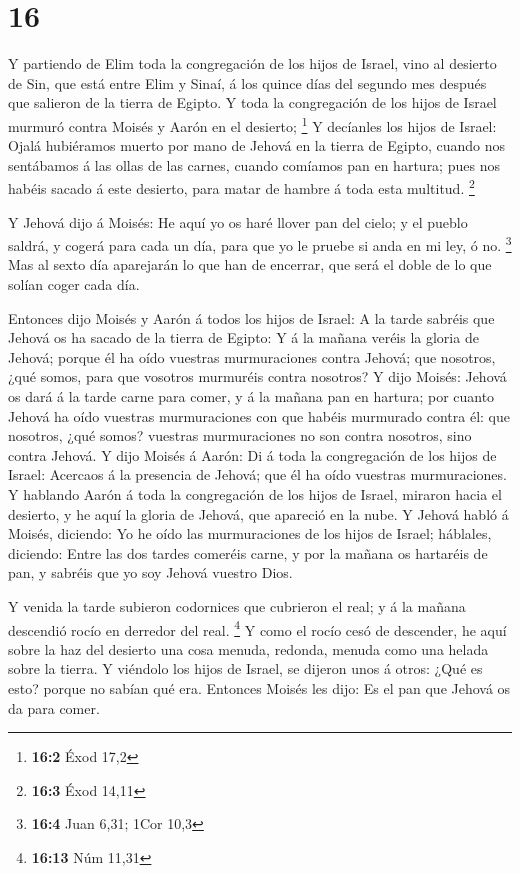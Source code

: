 \hypertarget{section-15}{%
\section{16}\label{section-15}}

 Y partiendo de Elim toda la congregación de los hijos de
Israel, vino al desierto de Sin, que está entre Elim y Sinaí, á los
quince días del segundo mes después que salieron de la tierra de Egipto.
 Y toda la congregación de los hijos de Israel murmuró
contra Moisés y Aarón en el desierto; \footnote{\textbf{16:2} Éxod 17,2}
 Y decíanles los hijos de Israel: Ojalá hubiéramos muerto
por mano de Jehová en la tierra de Egipto, cuando nos sentábamos á las
ollas de las carnes, cuando comíamos pan en hartura; pues nos habéis
sacado á este desierto, para matar de hambre á toda esta multitud.
\footnote{\textbf{16:3} Éxod 14,11}

 Y Jehová dijo á Moisés: He aquí yo os haré llover pan del
cielo; y el pueblo saldrá, y cogerá para cada un día, para que yo le
pruebe si anda en mi ley, ó no. \footnote{\textbf{16:4} Juan 6,31; 1Cor
  10,3}  Mas al sexto día aparejarán lo que han de encerrar,
que será el doble de lo que solían coger cada día.

 Entonces dijo Moisés y Aarón á todos los hijos de Israel: A
la tarde sabréis que Jehová os ha sacado de la tierra de Egipto:
 Y á la mañana veréis la gloria de Jehová; porque él ha oído
vuestras murmuraciones contra Jehová; que nosotros, ¿qué somos, para que
vosotros murmuréis contra nosotros?  Y dijo Moisés: Jehová
os dará á la tarde carne para comer, y á la mañana pan en hartura; por
cuanto Jehová ha oído vuestras murmuraciones con que habéis murmurado
contra él: que nosotros, ¿qué somos? vuestras murmuraciones no son
contra nosotros, sino contra Jehová.  Y dijo Moisés á Aarón:
Di á toda la congregación de los hijos de Israel: Acercaos á la
presencia de Jehová; que él ha oído vuestras murmuraciones.
 Y hablando Aarón á toda la congregación de los hijos de
Israel, miraron hacia el desierto, y he aquí la gloria de Jehová, que
apareció en la nube.  Y Jehová habló á Moisés, diciendo:
 Yo he oído las murmuraciones de los hijos de Israel;
háblales, diciendo: Entre las dos tardes comeréis carne, y por la mañana
os hartaréis de pan, y sabréis que yo soy Jehová vuestro Dios.

 Y venida la tarde subieron codornices que cubrieron el
real; y á la mañana descendió rocío en derredor del real. \footnote{\textbf{16:13}
  Núm 11,31}  Y como el rocío cesó de descender, he aquí
sobre la haz del desierto una cosa menuda, redonda, menuda como una
helada sobre la tierra.  Y viéndolo los hijos de Israel, se
dijeron unos á otros: ¿Qué es esto? porque no sabían qué era. Entonces
Moisés les dijo: Es el pan que Jehová os da para comer.

